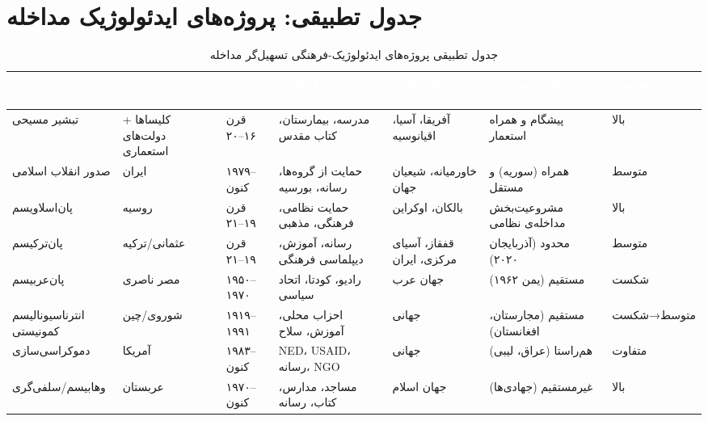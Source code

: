 \section{جدول تطبیقی: پروژه‌های ایدئولوژیک مداخله}
\label{sec:ch13-comparative-table}


\begin{landscape}
\begin{table}[htbp]
\centering
\caption{جدول تطبیقی پروژه‌های ایدئولوژیک-فرهنگی تسهیل‌گر مداخله}
\label{tab:ch13-comparative}
\begin{adjustbox}{max width=\linewidth}
\begin{tabularx}{\linewidth}{
    >{\raggedleft\arraybackslash}p{2.2cm}
    >{\raggedleft\arraybackslash}p{2cm}
    >{\centering\arraybackslash}p{1.8cm}
    >{\raggedleft\arraybackslash}p{2.5cm}
    >{\raggedleft\arraybackslash}p{2.5cm}
    >{\raggedleft\arraybackslash}p{2.5cm}
    >{\centering\arraybackslash}p{1.5cm}
}
\toprule
\rowcolor{PrimaryDeep}
\textcolor{white}{\textbf{پروژه}} &
\textcolor{white}{\textbf{عامل اصلی}} &
\textcolor{white}{\textbf{دوره}} &
\textcolor{white}{\textbf{ابزار اصلی}} &
\textcolor{white}{\textbf{جغرافیای هدف}} &
\textcolor{white}{\textbf{رابطه با مداخله‌ی نظامی}} &
\textcolor{white}{\textbf{موفقیت}} \\
\midrule
تبشیر مسیحی & کلیساها + دولت‌های استعماری & قرن ۱۶–۲۰ & مدرسه، بیمارستان، کتاب مقدس & آفریقا، آسیا، اقیانوسیه & پیشگام و همراه استعمار & بالا \\
\rowcolor{NeutralLight}
صدور انقلاب اسلامی & ایران & ۱۹۷۹–کنون & حمایت از گروه‌ها، رسانه، بورسیه & خاورمیانه، شیعیان جهان & همراه (سوریه) و مستقل & متوسط \\
پان‌اسلاویسم & روسیه & قرن ۱۹–۲۱ & حمایت نظامی، فرهنگی، مذهبی & بالکان، اوکراین & مشروعیت‌بخش مداخله‌ی نظامی & بالا \\
\rowcolor{NeutralLight}
پان‌ترکیسم & عثمانی/ترکیه & قرن ۱۹–۲۱ & رسانه، آموزش، دیپلماسی فرهنگی & قفقاز، آسیای مرکزی، ایران & محدود (آذربایجان ۲۰۲۰) & متوسط \\
پان‌عربیسم & مصر ناصری & ۱۹۵۰–۱۹۷۰ & رادیو، کودتا، اتحاد سیاسی & جهان عرب & مستقیم (یمن ۱۹۶۲) & شکست \\
\rowcolor{NeutralLight}
انترناسیونالیسم کمونیستی & شوروی/چین & ۱۹۱۹–۱۹۹۱ & احزاب محلی، آموزش، سلاح & جهانی & مستقیم (مجارستان، افغانستان) & متوسط→شکست \\
دموکراسی‌سازی & آمریکا & ۱۹۸۳–کنون & NED، USAID، رسانه، NGO & جهانی & هم‌راستا (عراق، لیبی) & متفاوت \\
\rowcolor{NeutralLight}
وهابیسم/سلفی‌گری & عربستان & ۱۹۷۰–کنون & مساجد، مدارس، کتاب، رسانه & جهان اسلام & غیرمستقیم (جهادی‌ها) & بالا \\
\bottomrule
\end{tabularx}
\end{adjustbox}
\end{table}
\end{landscape}


